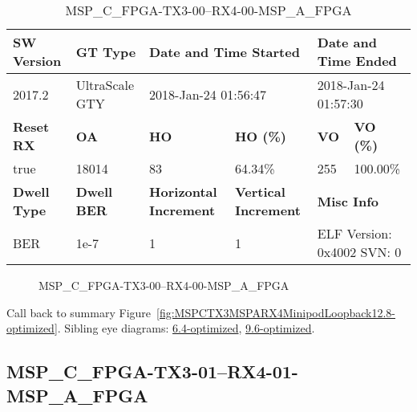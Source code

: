 \begin{table}[h]
\centering
\caption{MSP\_C\_FPGA-TX3-00--RX4-00-MSP\_A\_FPGA}
\label{tab:MSPCFPGATX300RX400MSPAFPGA12.8-optimized}
\begin{tabular}{@{}|l|l|l|l|l|l|@{}}
\toprule
\textbf{SW Version}                & \textbf{GT Type}   & \multicolumn{2}{l|}{\textbf{Date and Time Started}}            & \multicolumn{2}{l|}{\textbf{Date and Time Ended}}        \\ \midrule
2017.2                       & UltraScale GTY          & \multicolumn{2}{l|}{2018-Jan-24 01:56:47}                   & \multicolumn{2}{l|}{2018-Jan-24 01:57:30}               \\ \midrule
\textbf{Reset RX}                  & \textbf{OA} & \textbf{HO}   & \textbf{HO (\%)} & \textbf{VO} & \textbf{VO (\%)} \\ \midrule
true & 18014        & 83          & 64.34\%        & 255        & 100.00\%       \\ \midrule
\textbf{Dwell Type}                & \textbf{Dwell BER} & \textbf{Horizontal Increment} & \textbf{Vertical Increment}    & \multicolumn{2}{l|}{\textbf{Misc Info}}                  \\ \midrule
BER                            & 1e-7        & 1        & 1           & \multicolumn{2}{l|}{ELF Version: 0x4002 SVN: 0}                         \\ \bottomrule
\end{tabular}
\end{table}

\begin{figure}[h]
\caption{MSP\_C\_FPGA-TX3-00--RX4-00-MSP\_A\_FPGA} \label{fig:MSPCFPGATX300RX400MSPAFPGA12.8-optimized}
\end{figure}

Call back to summary Figure~\ref{fig:MSPCTX3MSPARX4MinipodLoopback12.8-optimized}.
Sibling eye diagrams: \hyperref[sec:MSPCFPGATX300RX400MSPAFPGA6.4-optimized]{6.4-optimized}, \hyperref[sec:MSPCFPGATX300RX400MSPAFPGA9.6-optimized]{9.6-optimized}.

\clearpage
\newpage


\subsection{MSP\_C\_FPGA-TX3-01--RX4-01-MSP\_A\_FPGA}\label{sec:MSPCFPGATX301RX401MSPAFPGA12.8-optimized}

